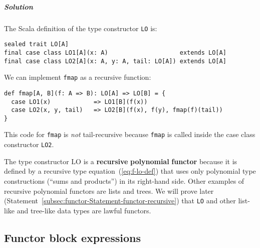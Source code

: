 \subparagraph{Solution}

The Scala definition of the type constructor \lstinline!LO! is:

\begin{lstlisting}
sealed trait LO[A]
final case class LO1[A](x: A)                    extends LO[A]
final case class LO2[A](x: A, y: A, tail: LO[A]) extends LO[A]
\end{lstlisting}

We can implement \lstinline!fmap! as a recursive function:
\begin{lstlisting}
def fmap[A, B](f: A => B): LO[A] => LO[B] = {
  case LO1(x)            => LO1[B](f(x))
  case LO2(x, y, tail)   => LO2[B](f(x), f(y), fmap(f)(tail))
}
\end{lstlisting}
This code for \lstinline!fmap! is \emph{not} tail-recursive because
\lstinline!fmap! is called inside the case class constructor \lstinline!LO2!. 

The type constructor $\text{LO}$ is a \textbf{recursive} \textbf{polynomial}
\textbf{functor} because it is defined by a recursive type equation~(\ref{eq:f-lo-def})
that uses only polynomial type constructions (\textsf{``}sums and products\textsf{''})
in its right-hand side. Other examples of recursive polynomial functors
are lists and trees. We will prove later (Statement~\ref{subsec:functor-Statement-functor-recursive})
that \lstinline!LO! and other list-like and tree-like data types
are lawful functors.

\subsection{Functor block expressions}

